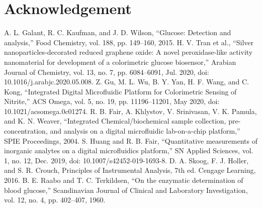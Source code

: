 \documentclass[conference]{IEEEtran}
\begin{document}
\section*{Acknowledgement}


\begin{thebibliography}{00}
 A. L. Galant, R. C. Kaufman, and J. D. Wilson, “Glucose: Detection and analysis,” Food Chemistry, vol. 188, pp. 149–160, 2015. 
 H. V. Tran et al., “Silver nanoparticles-decorated reduced graphene oxide: A novel peroxidase-like activity nanomaterial for development of a colorimetric glucose biosensor,” Arabian Journal of Chemistry, vol. 13, no. 7, pp. 6084–6091, Jul. 2020, doi: 10.1016/j.arabjc.2020.05.008.
 Z. Gu, M. L. Wu, B. Y. Yan, H. F. Wang, and C. Kong, “Integrated Digital Microfluidic Platform for Colorimetric Sensing of Nitrite,” ACS Omega, vol. 5, no. 19, pp. 11196–11201, May 2020, doi: 10.1021/acsomega.0c01274.
 R. B. Fair, A. Khlystov, V. Srinivasan, V. K. Pamula, and K. N. Weaver, “Integrated Chemical/biochemical sample collection, pre-concentration, and analysis on a digital microfluidic lab-on-a-chip platform,” SPIE Proceedings, 2004. 
 S. Huang and R. B. Fair, “Quantitative measurements of inorganic analytes on a digital microfluidics platform,” SN Applied Sciences, vol. 1, no. 12, Dec. 2019, doi: 10.1007/s42452-019-1693-8.
 D. A. Skoog, F. J. Holler, and S. R. Crouch, Principles of Instrumental Analysis, 7th ed. Cengage Learning, 2016.
 B. E. Raabo and T. C. Terkildsen, “On the enzymatic determination of blood glucose,” Scandinavian Journal of Clinical and Laboratory Investigation, vol. 12, no. 4, pp. 402–407, 1960. 
\end{thebibliography}
\end{document}
